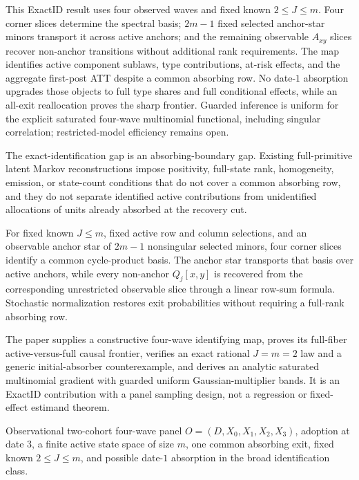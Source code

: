 This ExactID result uses four observed waves and fixed known \(2\leq J\leq m\).  Four corner slices determine the spectral basis; \(2m-1\) fixed selected anchor-star minors transport it across active anchors; and the remaining observable \(A_{xy}\) slices recover non-anchor transitions without additional rank requirements.  The map identifies active component sublaws, type contributions, at-risk effects, and the aggregate first-post ATT despite a common absorbing row.  No date-\(1\) absorption upgrades those objects to full type shares and full conditional effects, while an all-exit reallocation proves the sharp frontier.  Guarded inference is uniform for the explicit saturated four-wave multinomial functional, including singular correlation; restricted-model efficiency remains open.

The exact-identification gap is an absorbing-boundary gap.  Existing full-primitive latent Markov reconstructions impose positivity, full-state rank, homogeneity, emission, or state-count conditions that do not cover a common absorbing row, and they do not separate identified active contributions from unidentified allocations of units already absorbed at the recovery cut.

For fixed known \(J\leq m\), fixed active row and column selections, and an observable anchor star of \(2m-1\) nonsingular selected minors, four corner slices identify a common cycle-product basis.  The anchor star transports that basis over active anchors, while every non-anchor \(Q_j[x,y]\) is recovered from the corresponding unrestricted observable slice through a linear row-sum formula.  Stochastic normalization restores exit probabilities without requiring a full-rank absorbing row.

The paper supplies a constructive four-wave identifying map, proves its full-fiber active-versus-full causal frontier, verifies an exact rational \(J=m=2\) law and a generic initial-absorber counterexample, and derives an analytic saturated multinomial gradient with guarded uniform Gaussian-multiplier bands.  It is an ExactID contribution with a panel sampling design, not a regression or fixed-effect estimand theorem.

Observational two-cohort four-wave panel \(O=(D,X_0,X_1,X_2,X_3)\), adoption at date \(3\), a finite active state space of size \(m\), one common absorbing exit, fixed known \(2\leq J\leq m\), and possible date-\(1\) absorption in the broad identification class.

